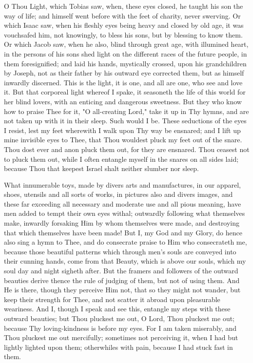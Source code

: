 \documentclass[b5paper,openright,12pt,twoside]{book}
\begin{document}
O Thou Light, which Tobias saw, when, these eyes closed, he taught his
son the way of life; and himself went before with the feet of charity,
never swerving. Or which Isaac saw, when his fleshly eyes being heavy
and closed by old age, it was vouchsafed him, not knowingly, to bless
his sons, but by blessing to know them. Or which Jacob saw, when he
also, blind through great age, with illumined heart, in the persons of
his sons shed light on the different races of the future people, in
them foresignified; and laid his hands, mystically crossed, upon
his grandchildren by Joseph, not as their father by his outward eye
corrected them, but as himself inwardly discerned. This is the light, it
is one, and all are one, who see and love it. But that corporeal light
whereof I spake, it seasoneth the life of this world for her blind
lovers, with an enticing and dangerous sweetness. But they who know how
to praise Thee for it, "O all-creating Lord," take it up in Thy hymns,
and are not taken up with it in their sleep. Such would I be. These
seductions of the eyes I resist, lest my feet wherewith I walk upon Thy
way be ensnared; and I lift up mine invisible eyes to Thee, that Thou
wouldest pluck my feet out of the snare. Thou dost ever and anon pluck
them out, for they are ensnared. Thou ceasest not to pluck them out,
while I often entangle myself in the snares on all sides laid; because
Thou that keepest Israel shalt neither slumber nor sleep.

What innumerable toys, made by divers arts and manufactures, in our
apparel, shoes, utensils and all sorts of works, in pictures also and
divers images, and these far exceeding all necessary and moderate use
and all pious meaning, have men added to tempt their own eyes withal;
outwardly following what themselves make, inwardly forsaking Him by whom
themselves were made, and destroying that which themselves have been
made! But I, my God and my Glory, do hence also sing a hymn to Thee, and
do consecrate praise to Him who consecrateth me, because those beautiful
patterns which through men's souls are conveyed into their cunning
hands, come from that Beauty, which is above our souls, which my soul
day and night sigheth after. But the framers and followers of the
outward beauties derive thence the rule of judging of them, but not of
using them. And He is there, though they perceive Him not, that so they
might not wander, but keep their strength for Thee, and not scatter it
abroad upon pleasurable weariness. And I, though I speak and see this,
entangle my steps with these outward beauties; but Thou pluckest me out,
O Lord, Thou pluckest me out; because Thy loving-kindness is before my
eyes. For I am taken miserably, and Thou pluckest me out mercifully;
sometimes not perceiving it, when I had but lightly lighted upon them;
otherwhiles with pain, because I had stuck fast in them.
\end{document}
